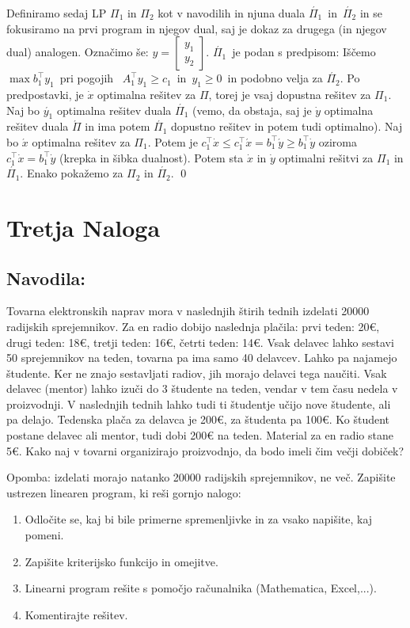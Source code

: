 \documentclass[a4paper, 10pt]{article}
\begin{document}
Definiramo sedaj LP $\Pi_1$ in $\Pi_2$ kot v navodilih in njuna duala $\acute{\Pi_1}$~in~$\acute{\Pi_2}$ in se fokusiramo na prvi program in njegov dual, saj je dokaz za drugega (in njegov dual) analogen. Označimo še: $y = \begin{bmatrix}
	y_1 \\
	y_2
\end{bmatrix}$. $\acute{\Pi_1}$~je podan s predpisom: Iščemo $\max b^{\top}_{1}y_1$~pri pogojih~ $A^{\top}_{1}y_1 \geq c_1$~in~$y_1 \geq 0$~in podobno velja za $\acute{\Pi_2}$. Po predpostavki, je $\dot{x}$ optimalna rešitev za $\Pi$, torej je vsaj dopustna rešitev za $\Pi_1$. Naj bo $\acute{y_1}$ optimalna rešitev duala $\acute{\Pi_1}$ (vemo, da obstaja, saj je $\dot{y}$ optimalna rešitev duala $\acute{\Pi}$ in ima potem $\acute{\Pi_1}$ dopustno rešitev in potem tudi optimalno). Naj bo $\acute{x}$ optimalna rešitev za $\Pi_1$. Potem je $c^{\top}_{1}\dot{x} \leq c^{\top}_{1}\acute{x} = b^{\top}_{1}\acute{y} \geq b^{\top}_{1}\dot{y}$ oziroma $c^{\top}_{1}\dot{x} = b^{\top}_{1}\dot{y}$ (krepka in šibka dualnost). Potem sta $\dot{x}$ in $\dot{y}$ optimalni rešitvi za $\Pi_1$ in $\acute{\Pi_1}$. Enako pokažemo za $\Pi_2$ in $\acute{\Pi_2}$. \qed

\section{Tretja Naloga}
\subsection{Navodila:}
Tovarna elektronskih naprav mora v naslednjih štirih tednih izdelati 20000 radijskih sprejemnikov. Za en radio dobijo naslednja plačila: 
prvi teden: 20€, drugi teden: 18€, tretji teden: 16€, četrti teden: 14€. Vsak delavec lahko sestavi 50 sprejemnikov na teden, tovarna pa ima samo 40 delavcev. Lahko pa najamejo študente. Ker ne znajo sestavljati radiov, jih morajo delavci tega naučiti. Vsak delavec (mentor) lahko izuči do 3 študente na teden, vendar v tem času nedela v proizvodnji. V naslednjih tednih lahko tudi ti študentje učijo nove študente, ali pa delajo. Tedenska plača za delavca je 200€, za študenta pa 100€. Ko študent postane delavec ali mentor, tudi dobi 200€ na teden. Material za en radio stane 5€. Kako naj v tovarni organizirajo proizvodnjo, da bodo imeli čim večji dobiček? 

Opomba: izdelati morajo natanko 20000 radijskih sprejemnikov, ne več. Zapišite ustrezen linearen program, ki reši gornjo nalogo: \begin{enumerate}[label=(\alph*)]
	\item Odločite se, kaj bi bile primerne spremenljivke in za vsako napišite, kaj pomeni.
	\item Zapišite kriterijsko funkcijo in omejitve.
	\item Linearni program rešite s pomočjo računalnika (Mathematica, Excel,...).
	\item Komentirajte rešitev.
\end{enumerate}
\end{document}
